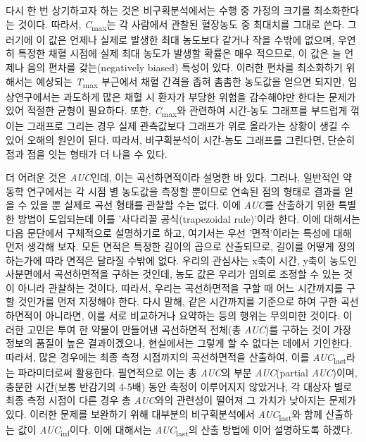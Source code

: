 \documentclass[
  11pt,
  krantz2, a4paper, twoside]{krantz}
\begin{document}
다시 한 번 상기하고자 하는 것은 비구획분석에서는 수행 중 가정의 크기를 최소화한다는 것이다. 따라서, \emph{C}\textsubscript{max}는 각 사람에서 관찰된 혈장농도 중 최대치를 그대로 쓴다. 그러기에 이 값은 언제나 실제로 발생한 최대 농도보다 같거나 작을 수밖에 없으며, 우연히 특정한 채혈 시점에 실제 최대 농도가 발생할 확률은 매우 적으므로, 이 값은 늘 언제나 음의 편차를 갖는(negatively biased) 특성이 있다. 이러한 편차를 최소화하기 위해서는 예상되는 \emph{T}\textsubscript{max} 부근에서 채혈 간격을 좁혀 촘촘한 농도값을 얻으면 되지만, 임상연구에서는 과도하게 많은 채혈 시 환자가 부당한 위험을 감수해야만 한다는 문제가 있어 적절한 균형이 필요하다. 또한, \emph{C}\textsubscript{max}와 관련하여 시간-농도 그래프를 부드럽게 꺾이는 그래프로 그리는 경우 실제 관측값보다 그래프가 위로 올라가는 상황이 생길 수 있어 오해의 원인이 된다. 따라서, 비구획분석이 시간-농도 그래프를 그린다면, 단순히 점과 점을 잇는 형태가 더 나을 수 있다.

더 어려운 것은 \emph{AUC}인데, 이는 곡선하면적이라 설명한 바 있다. 그러나, 일반적인 약동학 연구에서는 각 시점 별 농도값을 측정할 뿐이므로 연속된 점의 형태로 결과를 얻을 수 있을 뿐 실제로 곡선 형태를 관찰할 수는 없다. 이에 \emph{AUC}를 산출하기 위한 특별한 방법이 도입되는데 이를 '사다리꼴 공식(trapezoidal rule)'이라 한다. 이에 대해서는 다음 문단에서 구체적으로 설명하기로 하고, 여기서는 우선 '면적'이라는 특성에 대해 먼저 생각해 보자. 모든 면적은 특정한 길이의 곱으로 산출되므로, 길이를 어떻게 정의하는가에 따라 면적은 달라질 수밖에 없다. 우리의 관심사는 x축이 시간, y축이 농도인 사분면에서 곡선하면적을 구하는 것인데, 농도 값은 우리가 임의로 조정할 수 있는 것이 아니라 관찰하는 것이다. 따라서, 우리는 곡선하면적을 구할 때 어느 시간까지를 구할 것인가를 먼저 지정해야 한다. 다시 말해, 같은 시간까지를 기준으로 하여 구한 곡선하면적이 아니라면, 이를 서로 비교하거나 요약하는 등의 행위는 무의미한 것이다. 이러한 고민은 투여 한 약물이 만들어낸 곡선하면적 전체(총 \emph{AUC})를 구하는 것이 가장 정보의 품질이 높은 결과이겠으나, 현실에서는 그렇게 할 수 없다는 데에서 기인한다. 따라서, 많은 경우에는 최종 측정 시점까지의 곡선하면적을 산출하여, 이를 \emph{AUC}\textsubscript{last}라는 파라미터로써 활용한다. 필연적으로 이는 총 \emph{AUC}의 부분 \emph{AUC}(partial \emph{AUC})이며, 충분한 시간(보통 반감기의 4-5배) 동안 측정이 이루어지지 않았거나, 각 대상자 별로 최종 측정 시점이 다른 경우 총 \emph{AUC}와의 관련성이 떨어져 그 가치가 낮아지는 문제가 있다. 이러한 문제를 보완하기 위해 대부분의 비구획분석에서 \emph{AUC}\textsubscript{last}와 함께 산출하는 값이 \emph{AUC}\textsubscript{inf}이다. 이에 대해서는 \emph{AUC}\textsubscript{last}의 산출 방법에 이어 설명하도록 하겠다.
\end{document}
